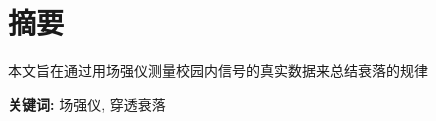 \section*{ \centering 摘要}

\vskip0.5cm
本文旨在通过用场强仪测量校园内信号的真实数据来总结衰落的规律

\textbf{关键词:} 场强仪, 穿透衰落

\clearpage
%
%
%
%
%
